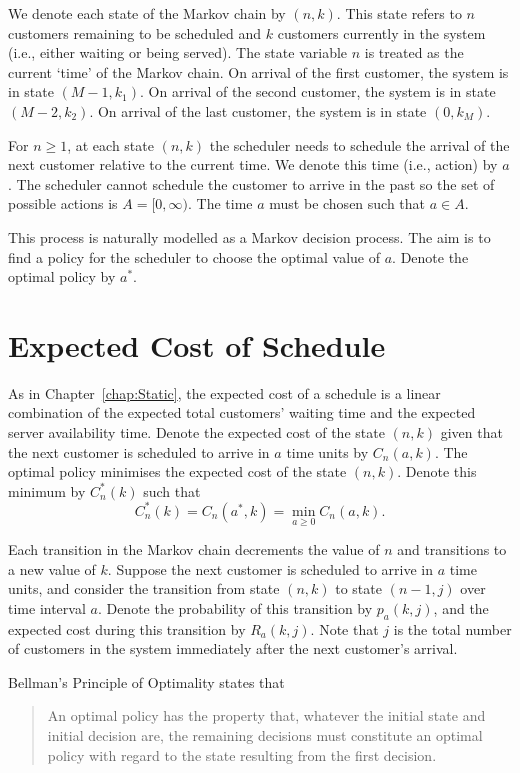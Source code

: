We denote each state of the Markov chain by $(n, k)$. This state refers to $n$ customers remaining to be scheduled and $k$ customers currently in the system (i.e., either waiting or being served). The state variable $n$ is treated as the current `time' of the Markov chain. On arrival of the first customer, the system is in state $(M - 1, k_{1})$. On arrival of the second customer, the system is in state $(M - 2, k_{2})$. On arrival of the last customer, the system is in state $(0, k_{M})$.

For $n \geq 1$, at each state $(n, k)$ the scheduler needs to schedule the arrival of the next customer relative to the current time. We denote this time (i.e., action) by $a$. The scheduler cannot schedule the customer to arrive in the past so the set of possible actions is $A = [0, \infty)$. The time $a$ must be chosen such that $a \in A$.

This process is naturally modelled as a Markov decision process. The aim is to find a policy for the scheduler to choose the optimal value of $a$. Denote the optimal policy by $a^{*}$.

\section{Expected Cost of Schedule}
As in Chapter~\ref{chap:Static}, the expected cost of a schedule is a linear combination of the expected total customers' waiting time and the expected server availability time. Denote the expected cost of the state $(n, k)$ given that the next customer is scheduled to arrive in $a$ time units by $C_{n} (a, k)$. The optimal policy minimises the expected cost of the state $(n, k)$. Denote this minimum by $C_{n}^{*} (k)$ such that
\begin{equation}
	C_{n}^{*} (k) = C_{n} (a^{*}, k) = \min_{a \geq 0} C_{n} (a, k).
\end{equation}

Each transition in the Markov chain decrements the value of $n$ and transitions to a new value of $k$. Suppose the next customer is scheduled to arrive in $a$ time units, and consider the transition from state $(n, k)$ to state $(n - 1, j)$ over time interval $a$. Denote the probability of this transition by $p_{a} (k, j)$, and the expected cost during this transition by $R_{a} (k, j)$. Note that $j$ is the total number of customers in the system immediately after the next customer's arrival.

Bellman's Principle of Optimality \citep{Sniedovich} states that
\begin{quote}
	An optimal policy has the property that, whatever the initial state and initial decision are, the remaining decisions must constitute an optimal policy with regard to the state resulting from the first decision.
\end{quote}

